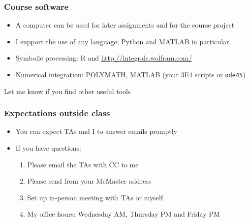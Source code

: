 \begin{frame}\frametitle{Course software}
	\begin{itemize}
		\item	A computer can be used for later assignments and for the course project 
		\item	I support the use of any language; Python and MATLAB in particular
		\item	Symbolic processing: R and {\small\href{http://integrals.wolfram.com/}{http://integrals.wolfram.com/}}
		\item	Numerical integration: POLYMATH, MATLAB (your 3E4 scripts or \texttt{ode45})
	\end{itemize}
	\vspace{12pt}
	Let me know if you find other useful tools
\end{frame}

\begin{frame}\frametitle{Expectations outside class}
	\begin{itemize}
		\item	You can expect TAs and I to answer emails promptly 
		\item	If you have questions: 
		\begin{enumerate}
			\item	Please email the TAs with CC to me \hfill {\tiny{\color{myOrange}{$\longleftarrow$ hopefully this solves your problem}}}
			\item	Please send from your McMaster address
			\item	Set up in-person meeting with TAs or myself 
			\item	My office hours: Wednesday AM, Thursday PM and Friday PM
		\end{enumerate}
	\end{itemize}
\end{frame}

